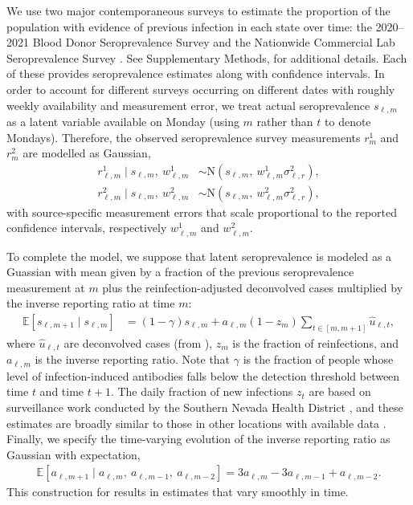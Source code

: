 We use two major contemporaneous surveys to estimate the proportion of the
population with evidence of previous infection in each state over time: the
2020--2021 Blood Donor Seroprevalence Survey and the Nationwide Commercial Lab
Seroprevalence Survey \citep{cdc2021blood, cdc2021comm}. See Supplementary
Methods,  for additional details. Each of these provides
seroprevalence estimates along with confidence intervals. In order to account
for different surveys occurring on different dates with roughly weekly
availability and measurement error, we treat actual seroprevalence $s_{\ell,m}$
as a latent variable available on Monday (using $m$ rather than $t$ to denote
Mondays). Therefore, the observed seroprevalence survey measurements $r^1_m$ and
$r^2_m$ are modelled as Gaussian,
\begin{align}
\label{eq:sero-measurements}
r^1_{\ell,m} \mid s_{\ell,m},\ w^1_{\ell,m} &\sim \textrm{N}(s_{\ell,m},\ w^1_{\ell,m}\sigma^2_{\ell,r}),\\
r^2_{\ell,m} \mid s_{\ell,m},\  w^2_{\ell,m}
  &\sim \textrm{N}(s_{\ell,m},\ w^2_{\ell,m}\sigma^2_{\ell,r}),
\end{align}
with source-specific measurement errors that scale proportional to the reported
confidence intervals, respectively $w^1_{\ell,m}$ and $w^2_{\ell,m}$.  

To complete the model, we suppose that latent seroprevalence is modeled as a
Guassian with mean given by a fraction of the previous seroprevalence
measurement at $m$ plus the reinfection-adjusted deconvolved cases multiplied by
the inverse reporting ratio at time $m$:
\begin{align}
  \label{eq:expect-sero}
\mathbb{E}[s_{\ell,m+1} \mid s_{\ell,m}] & = (1 -\gamma) s_{\ell,m} 
+ a_{\ell,m} (1 - z_{m}) \sum_{t\in[m,m+1]}\widehat{u}_{\ell,t},
\end{align}
where $\widehat{u}_{\ell,t}$ are deconvolved cases (from
), $z_{m}$ is the fraction of reinfections, and
$a_{\ell,m}$ is the inverse reporting ratio. Note that $\gamma$ is the fraction
of people whose level of infection-induced antibodies falls below the detection
threshold between time $t$ and time $t+1$. The daily fraction of new infections
$z_t$ are based on surveillance work conducted by the Southern Nevada Health
District \citep{ruff2022rapid}, and these estimates are broadly similar to those
in other locations with available data  \citep{ruff2022rapid, nyreinfect2021,
hireinfect2022, wareinfect2022}. Finally, we specify the time-varying evolution
of the inverse reporting ratio as Gaussian with expectation,
\begin{align}
  \label{eq:report-ratio}
\mathbb{E}[a_{\ell,m+1} \mid a_{\ell,m},\ a_{\ell,m-1},\ a_{\ell,m-2}] = 3a_{\ell,m} - 3a_{\ell,m-1} + a_{\ell,m-2}.
\end{align}
This construction for  results in estimates that vary
smoothly in time.

